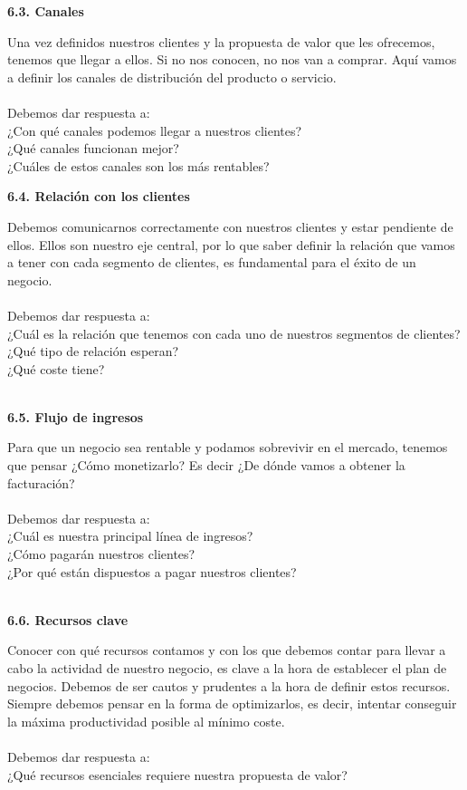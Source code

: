 \item \textbf{6.3. Canales}
\item Una vez definidos nuestros clientes y la propuesta de valor que les ofrecemos, tenemos que llegar a ellos. Si no nos conocen, no nos van a comprar. Aquí vamos a definir los canales de distribución del producto o servicio.\\\\
Debemos dar respuesta a:\\
¿Con qué canales podemos llegar a nuestros clientes?\\
¿Qué canales funcionan mejor?\\
¿Cuáles de estos canales son los más rentables?
\\
\item \textbf{6.4. Relación con los clientes}
\item Debemos comunicarnos correctamente con nuestros clientes y estar pendiente de ellos. Ellos son nuestro eje central, por lo que saber definir la relación que vamos a tener con cada segmento de clientes, es fundamental para el éxito de un negocio.\\\\
Debemos dar respuesta a:\\
¿Cuál es la relación que tenemos con cada uno de nuestros segmentos de clientes?\\
¿Qué tipo de relación esperan?\\
¿Qué coste tiene?\\\\

\item \textbf{6.5. Flujo de ingresos}\\
\item Para que un negocio sea rentable y podamos sobrevivir en el mercado, tenemos que pensar ¿Cómo monetizarlo? Es decir ¿De dónde vamos a obtener la facturación?\\\\
Debemos dar respuesta a:\\
¿Cuál es nuestra principal línea de ingresos? \\
¿Cómo pagarán nuestros clientes?\\
¿Por qué están dispuestos a pagar nuestros clientes?\\\\

\item \textbf{6.6. Recursos clave}
\item Conocer con qué recursos contamos y con los que debemos contar para llevar a cabo la actividad de nuestro negocio, es clave a la hora de establecer el plan de negocios. Debemos de ser cautos y prudentes a la hora de definir estos recursos. Siempre debemos pensar en la forma de optimizarlos, es decir, intentar conseguir la máxima productividad posible al mínimo coste.\\\\
Debemos dar respuesta a:\\
¿Qué recursos esenciales requiere nuestra propuesta de valor?\\\\


